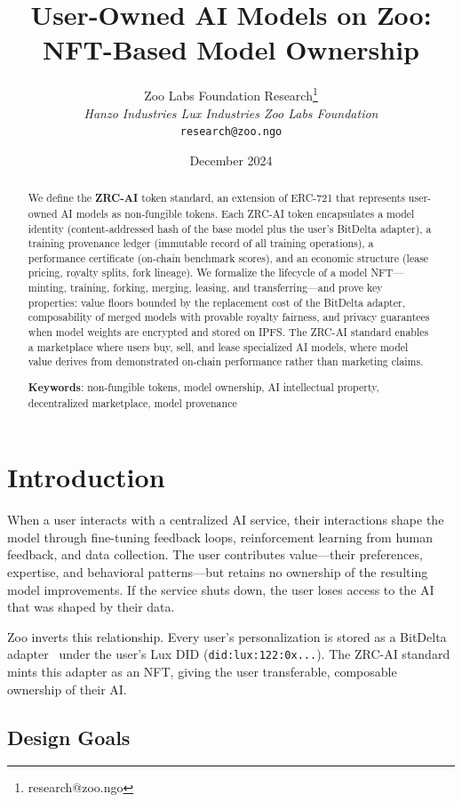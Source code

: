 \documentclass[11pt,letterpaper]{article}
\title{\textbf{User-Owned AI Models on Zoo:\\NFT-Based Model Ownership}}
\author{
Zoo Labs Foundation Research\thanks{research@zoo.ngo}\\
\textit{Hanzo Industries \quad Lux Industries \quad Zoo Labs Foundation}\\
\texttt{research@zoo.ngo}
}
\date{December 2024}
\begin{document}
\zoocoverpage

\begin{abstract}
We define the \textbf{ZRC-AI} token standard, an extension of ERC-721 that represents user-owned AI models as non-fungible tokens. Each ZRC-AI token encapsulates a model identity (content-addressed hash of the base model plus the user's BitDelta adapter), a training provenance ledger (immutable record of all training operations), a performance certificate (on-chain benchmark scores), and an economic structure (lease pricing, royalty splits, fork lineage). We formalize the lifecycle of a model NFT---minting, training, forking, merging, leasing, and transferring---and prove key properties: value floors bounded by the replacement cost of the BitDelta adapter, composability of merged models with provable royalty fairness, and privacy guarantees when model weights are encrypted and stored on IPFS. The ZRC-AI standard enables a marketplace where users buy, sell, and lease specialized AI models, where model value derives from demonstrated on-chain performance rather than marketing claims.

\textbf{Keywords}: non-fungible tokens, model ownership, AI intellectual property, decentralized marketplace, model provenance
\end{abstract}

\section{Introduction}

When a user interacts with a centralized AI service, their interactions shape the model through fine-tuning feedback loops, reinforcement learning from human feedback, and data collection. The user contributes value---their preferences, expertise, and behavioral patterns---but retains no ownership of the resulting model improvements. If the service shuts down, the user loses access to the AI that was shaped by their data.

Zoo inverts this relationship. Every user's personalization is stored as a BitDelta adapter~\cite{liu2024bitdelta} under the user's Lux DID (\texttt{did:lux:122:0x...}). The ZRC-AI standard mints this adapter as an NFT, giving the user transferable, composable ownership of their AI.

\subsection{Design Goals}
\end{document}
